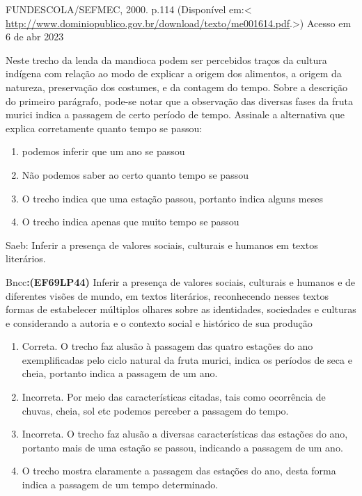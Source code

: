 {\begin{description}
\tightlist
\item[Alfabetização : livro do aluno / Ana Rosa Abreu ... {[}et al.{]}
Brasília]
FUNDESCOLA/SEFMEC, 2000. p.114 (Disponível em:\textless{}
\url{http://www.dominiopublico.gov.br/download/texto/me001614.pdf}.\textgreater)
Acesso em 6 de abr 2023
\end{description}

Neste trecho da lenda da mandioca podem ser percebidos traços da cultura
indígena com relação ao modo de explicar a origem dos alimentos, a
origem da natureza, preservação dos costumes, e da contagem do tempo.
Sobre a descrição do primeiro parágrafo, pode-se notar que a observação
das diversas fases da fruta murici indica a passagem de certo período de
tempo. Assinale a alternativa que explica corretamente quanto tempo se
passou:

\begin{enumerate}
\def\labelenumi{\alph{enumi})}
\item
  podemos inferir que um ano se passou
\item
  Não podemos saber ao certo quanto tempo se passou
\item
  O trecho indica que uma estação passou, portanto indica alguns meses
\item
  O trecho indica apenas que muito tempo se passou
\end{enumerate}

Saeb: Inferir a presença de valores sociais, culturais e humanos em
textos literários.

Bncc\textbf{:(EF69LP44)} Inferir a presença de valores sociais,
culturais e humanos e de diferentes visões de mundo, em textos
literários, reconhecendo nesses textos formas de estabelecer múltiplos
olhares sobre as identidades, sociedades e culturas e considerando a
autoria e o contexto social e histórico de sua produção

\begin{enumerate}
\def\labelenumi{\arabic{enumi}.}
\item
  Correta. O trecho faz alusão à passagem das quatro estações do ano
  exemplificadas pelo ciclo natural da fruta murici, indica os períodos
  de seca e cheia, portanto indica a passagem de um ano.
\item
  Incorreta. Por meio das características citadas, tais como ocorrência
  de chuvas, cheia, sol etc podemos perceber a passagem do tempo.
\item
  Incorreta. O trecho faz alusão a diversas características das estações
  do ano, portanto mais de uma estação se passou, indicando a passagem
  de um ano.
\item
  O trecho mostra claramente a passagem das estações do ano, desta forma
  indica a passagem de um tempo determinado.
\end{enumerate}

}
